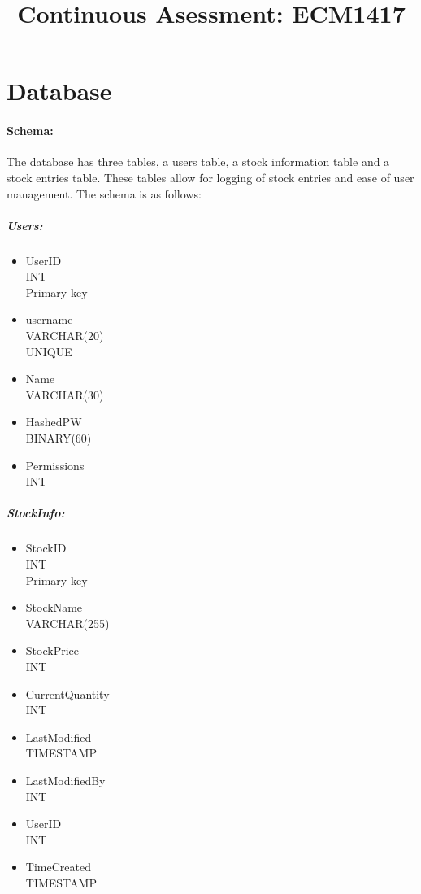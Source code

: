 \documentclass[12pt,a4paper]{report}
\title{Continuous Asessment: ECM1417}
\begin{document}
	\maketitle
	\newpage
	\section{Database}
	\paragraph{Schema:}
	The database has three tables, a users table, a stock information table and a stock entries table. These tables allow for logging of stock entries and ease of user management. The schema is as follows:
	\begin{multicols}{3}
	\subparagraph{Users:}
	\begin{itemize}
		\item UserID \\ INT \\ Primary key
		\item username \\ VARCHAR(20) \\ UNIQUE
		\item Name \\ VARCHAR(30)
		\item HashedPW \\ BINARY(60)
		\item Permissions \\ INT
	\end{itemize}
	\columnbreak
	\subparagraph{StockInfo:}
	\begin{itemize}
		\item StockID \\ INT \\ Primary key
		\item StockName \\ VARCHAR(255)
		\item StockPrice \\ INT
		\item CurrentQuantity \\ INT
		\item LastModified \\ TIMESTAMP
		\item LastModifiedBy \\ INT
		\item UserID \\ INT
		\item TimeCreated \\ TIMESTAMP

\end{itemize}
\end{multicols}
\end{document}

